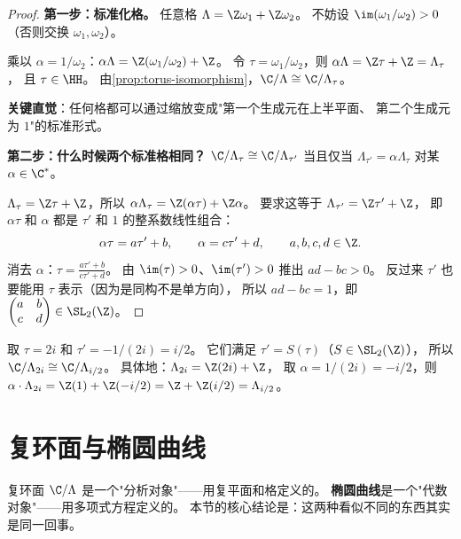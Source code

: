 \begin{proof}
\textbf{第一步：标准化格。}
任意格 $\Lambda = \Z\omega_1 + \Z\omega_2$。
不妨设 $\im(\omega_1/\omega_2) > 0$（否则交换 $\omega_1, \omega_2$）。

乘以 $\alpha = 1/\omega_2$：$\alpha\Lambda = \Z(\omega_1/\omega_2) + \Z$。
令 $\tau = \omega_1/\omega_2$，则 $\alpha\Lambda = \Z\tau + \Z = \Lambda_\tau$，
且 $\tau \in \HH$。
由\cref{prop:torus-isomorphism}，$\C/\Lambda \cong \C/\Lambda_\tau$。

\textbf{关键直觉}：任何格都可以通过缩放变成"第一个生成元在上半平面、
第二个生成元为 $1$"的标准形式。

\textbf{第二步：什么时候两个标准格相同？}
$\C/\Lambda_\tau \cong \C/\Lambda_{\tau'}$ 当且仅当
$\Lambda_{\tau'} = \alpha\Lambda_\tau$ 对某 $\alpha \in \C^*$。

$\Lambda_\tau = \Z\tau + \Z$，所以 $\alpha\Lambda_\tau = \Z(\alpha\tau) + \Z\alpha$。
要求这等于 $\Lambda_{\tau'} = \Z\tau' + \Z$，
即 $\alpha\tau$ 和 $\alpha$ 都是 $\tau'$ 和 $1$ 的整系数线性组合：
\[
  \alpha\tau = a\tau' + b, \qquad \alpha = c\tau' + d,
  \qquad a,b,c,d \in \Z.
\]
消去 $\alpha$：$\tau = \frac{a\tau' + b}{c\tau' + d}$。
由 $\im(\tau) > 0$、$\im(\tau') > 0$ 推出 $ad - bc > 0$。
反过来 $\tau'$ 也要能用 $\tau$ 表示（因为是同构不是单方向），
所以 $ad - bc = 1$，即 $\begin{pmatrix} a & b \\ c & d \end{pmatrix} \in \SL_2(\Z)$。
\end{proof}

\begin{example}[同一个环面的不同参数]
\label{ex:equivalent-tau}
取 $\tau = 2i$ 和 $\tau' = -1/(2i) = i/2$。
它们满足 $\tau' = S(\tau)$（$S \in \SL_2(\Z)$），
所以 $\C/\Lambda_{2i} \cong \C/\Lambda_{i/2}$。
具体地：$\Lambda_{2i} = \Z(2i) + \Z$，
取 $\alpha = 1/(2i) = -i/2$，则
$\alpha \cdot \Lambda_{2i} = \Z(1) + \Z(-i/2) = \Z + \Z(i/2) = \Lambda_{i/2}$。
\end{example}


\section{复环面与椭圆曲线}
\label{sec:tori-and-ec}

复环面 $\C/\Lambda$ 是一个"分析对象"——用复平面和格定义的。
\textbf{椭圆曲线}是一个"代数对象"——用多项式方程定义的。
本节的核心结论是：这两种看似不同的东西其实是同一回事。

